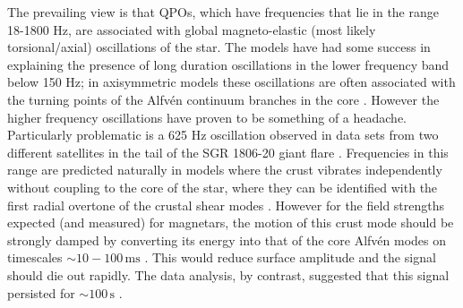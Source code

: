 \documentclass{emulateapj}
\begin{document}
The prevailing view is that QPOs, which have frequencies that lie in the range 18-1800 Hz, are associated with global magneto-elastic (most likely torsional/axial) oscillations of the star. The models have had some success in explaining the presence of long duration oscillations in the lower frequency band below 150 Hz; in axisymmetric models these oscillations are often associated with the turning points of the Alfv\'en continuum branches in the core \citep{Levin07}. However the higher frequency oscillations have proven to be something of a headache. Particularly problematic is a 625 Hz oscillation observed in data sets from two different satellites in the tail of the SGR 1806-20 giant flare \citep{Watts06, Strohmayer06}.  Frequencies in this range are predicted naturally in models where the crust vibrates independently without coupling to the core of the star, where they can be identified with the first radial overtone of the crustal shear modes \citep{Piro05}.  However for the field strengths expected (and measured) for magnetars, the motion of this crust mode should be strongly damped by converting its energy into that of the core Alfv\'en modes on timescales $\sim10-100 \, \mathrm{ms}$ \citep{Levin06,vanHoven11,Colaiuda11,Gabler12}. This would reduce surface amplitude and the signal should die out rapidly. The data analysis, by contrast, suggested that this signal persisted for $\sim\!\!\! 100 \, \mathrm{s}$ \citep{Strohmayer06}.
\end{document}
